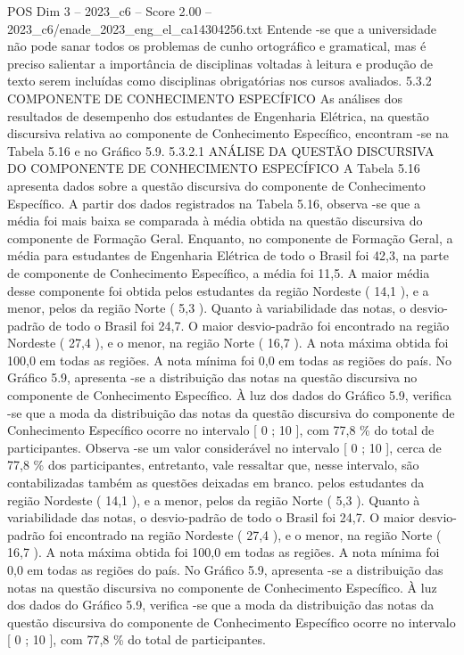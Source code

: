 \begin{textsample}{POS Dim 3 – 2023\_c6 – Score 2.00 – 2023\_c6/enade\_2023\_eng\_el\_ca14304256.txt}
Entende -se que a universidade não pode sanar todos os problemas de cunho ortográfico e gramatical, mas é preciso salientar a importância de disciplinas voltadas à leitura e produção de texto serem incluídas como disciplinas obrigatórias nos cursos avaliados. 5.3.2 COMPONENTE DE CONHECIMENTO ESPECÍFICO As análises dos resultados de desempenho dos estudantes de Engenharia Elétrica, na questão discursiva relativa ao componente de Conhecimento Específico, encontram -se na Tabela 5.16 e no Gráfico 5.9. 5.3.2.1 ANÁLISE DA QUESTÃO DISCURSIVA DO COMPONENTE DE CONHECIMENTO ESPECÍFICO A Tabela 5.16 apresenta dados sobre a questão discursiva do componente de Conhecimento Específico.
A partir dos dados registrados na Tabela 5.16, observa -se que a média foi mais baixa se comparada à média obtida na questão discursiva do componente de Formação Geral.
Enquanto, no componente de Formação Geral, a média para estudantes de Engenharia Elétrica de todo o Brasil foi 42,3, na parte de componente de Conhecimento Específico, a média foi 11,5.
A maior média desse componente foi obtida pelos estudantes da região Nordeste ( 14,1 ), e a menor, pelos da região Norte ( 5,3 ).
Quanto à variabilidade das notas, o desvio-padrão de todo o Brasil foi 24,7.
O maior desvio-padrão foi encontrado na região Nordeste ( 27,4 ), e o menor, na região Norte ( 16,7 ).
A nota máxima obtida foi 100,0 em todas as regiões.
A nota mínima foi 0,0 em todas as regiões do país.
No Gráfico 5.9, apresenta -se a distribuição das notas na questão discursiva no componente de Conhecimento Específico.
À luz dos dados do Gráfico 5.9, verifica -se que a moda da distribuição das notas da questão discursiva do componente de Conhecimento Específico ocorre no intervalo [ 0 ; 10 ], com 77,8 \% do total de participantes.
Observa -se um valor considerável no intervalo [ 0 ; 10 ], cerca de 77,8 \% dos participantes, entretanto, vale ressaltar que, nesse intervalo, são contabilizadas também as questões deixadas em branco. pelos estudantes da região Nordeste ( 14,1 ), e a menor, pelos da região Norte ( 5,3 ).
Quanto à variabilidade das notas, o desvio-padrão de todo o Brasil foi 24,7.
O maior desvio-padrão foi encontrado na região Nordeste ( 27,4 ), e o menor, na região Norte ( 16,7 ).
A nota máxima obtida foi 100,0 em todas as regiões.
A nota mínima foi 0,0 em todas as regiões do país.
No Gráfico 5.9, apresenta -se a distribuição das notas na questão discursiva no componente de Conhecimento Específico.
À luz dos dados do Gráfico 5.9, verifica -se que a moda da distribuição das notas da questão discursiva do componente de Conhecimento Específico ocorre no intervalo [ 0 ; 10 ], com 77,8 \% do total de participantes.

\end{textsample}
